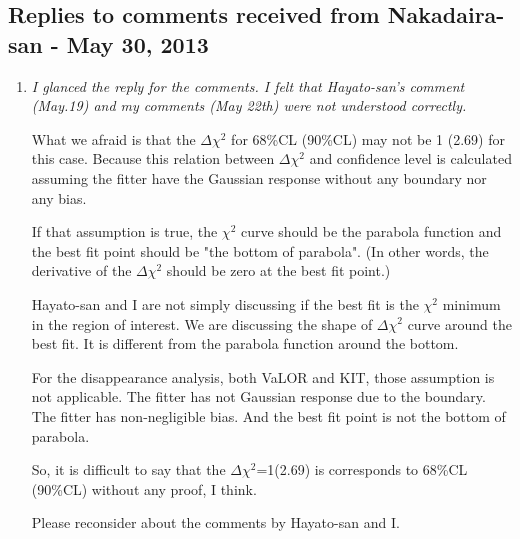 \subsection{Replies to comments received from Nakadaira-san - May 30, 2013}

\begin{enumerate}
\vspace{5 mm}
\item
{\em
  I glanced the reply for the comments. I felt that Hayato-san's comment
  (May.19) and my comments (May 22th) were not understood correctly.

  What we afraid is that the $\Delta\chi^2$ for 68\%CL (90\%CL) may not be 1
  (2.69) for this case. Because this relation between $\Delta \chi^2$ and
  confidence level is calculated assuming the fitter have the Gaussian response 
  without any boundary nor any bias.
  
  If that assumption is true, the $\chi^2$ curve should be the parabola function
  and the best fit point should be "the bottom of parabola".
  (In other words, the derivative of the $\Delta\chi^2$ should be zero at the best fit point.)

  Hayato-san and I are not simply discussing if the best fit is the
  $\chi^2$ minimum in the region of interest. We are discussing the shape of $\Delta\chi^2$
  curve around the best fit. It is different from the parabola function around the bottom.
  
  For the disappearance analysis, both VaLOR and KIT, those assumption is not applicable.
  The fitter has not Gaussian response due to the boundary.
  The fitter has non-negligible bias. And the best fit point is not the bottom of parabola. 
  
  So, it is difficult to say that the $\Delta\chi^2$=1(2.69) is corresponds to 68\%CL
  (90\%CL) without any proof, I think. 
  
  Please reconsider about the comments by Hayato-san and I.
}\\
\\

\end{enumerate}
